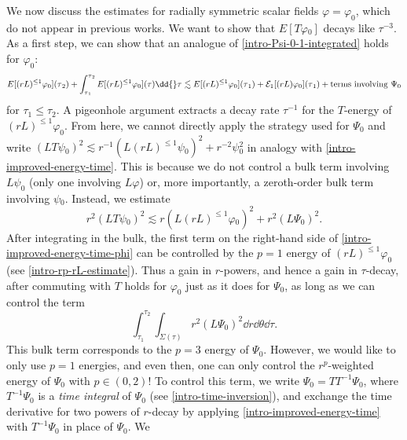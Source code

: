 \documentclass[10pt, reqno]{amsart}
\begin{document}
We now discuss the estimates for radially symmetric scalar fields
\(\varphi{}=\varphi_0\), which do not appear in previous works. We want to show
that \(E[T\varphi{}_0]\) decays like \(\tau^{-3}\). As a first step, we can show
that an analogue of \cref{intro-Psi-0-1-integrated} holds for \(\varphi_0\):
\begin{equation}\label{intro-integrated-T}
E[(rL)^{\le 1}\varphi{}_0](\tau{}_2) + \int_{\tau{}_1}^{\tau{}_2} E[(rL)^{\le 1}\varphi{}_0](\tau{})\dd{}\tau{}\lesssim E[(rL)^{\le 1}\varphi{}_0](\tau{}_1) + \mathcal{E}_1[(rL)\varphi{}_0](\tau{}_1) + \textnormal{terms involving }\Psi{}_0
\end{equation}
for \(\tau_1\le \tau_2\). A pigeonhole argument extracts a decay rate \(\tau{}^{-1}\) for the
\(T\)-energy of \((rL)^{\le 1}\varphi_0\). From here, we cannot directly apply
the strategy used for \(\Psi_0\) and write \((LT\psi{}_0)^2 \lesssim
r^{-1}(L(rL)^{\le 1}\psi{}_0)^2 + r^{-2}\psi{}_0^2\) in analogy with
\cref{intro-improved-energy-time}. This is because we do not control a bulk term
involving \(L\psi_0\) (only one involving \(L\varphi{}\)) or, more importantly,
a zeroth-order bulk term involving \(\psi{}_0\). Instead, we estimate
\begin{equation}\label{intro-improved-energy-time-phi}
r^2(LT\psi{}_0)^2\lesssim r(L(rL)^{\le 1}\varphi{}_0)^2 + r^2(L\Psi{}_0)^2.
\end{equation}
After integrating in the bulk, the first term on the right-hand side of
\cref{intro-improved-energy-time-phi} can be controlled by the \(p=1\) energy of
\((rL)^{\le 1}\varphi_0\) (see \cref{intro-rp-rL-estimate}). Thus a gain in
\(r\)-powers, and hence a gain in \(\tau{}\)-decay, after commuting with \(T\)
holds for \(\varphi_0\) just as it does for \(\Psi_0\), as long as we can control
the term
\begin{equation}
\int_{\tau_1}^{\tau_2} \int _{\Sigma{}(\tau{})} r^2(L\Psi{}_0)^2\dd{}r\dd{}\theta{}\dd{}\tau{}.
\end{equation}
This bulk term corresponds to the \(p = 3\) energy of \(\Psi_0\). However, we would
like to only use \(p = 1\) energies, and even then, one can only control the
\(r^p\)-weighted energy of \(\Psi_0\) with \(p\in (0,2)\)! To control this term,
we write \(\Psi{}_0 = TT^{-1}\Psi{}_0\), where \(T^{-1}\Psi{}_0\) is a \emph{time
integral} of \(\Psi{}_0\) (see \cref{intro-time-inversion}), and exchange the time
derivative for two powers of \(r\)-decay by applying
\cref{intro-improved-energy-time} with \(T^{-1}\Psi_0\) in place of \(\Psi_0\). We
\end{document}

